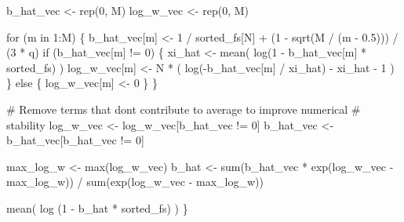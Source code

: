 \documentclass[
  letterpaper,
  DIV=11,
  numbers=noendperiod]{scrartcl}
\newenvironment{Shaded}{\begin{snugshade}}{\end{snugshade}}
\newcommand{\CommentTok}[1]{\textcolor[rgb]{0.37,0.37,0.37}{#1}}
\newcommand{\ControlFlowTok}[1]{\textcolor[rgb]{0.00,0.23,0.31}{#1}}
\newcommand{\DecValTok}[1]{\textcolor[rgb]{0.68,0.00,0.00}{#1}}
\newcommand{\FloatTok}[1]{\textcolor[rgb]{0.68,0.00,0.00}{#1}}
\newcommand{\FunctionTok}[1]{\textcolor[rgb]{0.28,0.35,0.67}{#1}}
\newcommand{\NormalTok}[1]{\textcolor[rgb]{0.00,0.23,0.31}{#1}}
\newcommand{\OtherTok}[1]{\textcolor[rgb]{0.00,0.23,0.31}{#1}}
\newcommand{\SpecialCharTok}[1]{\textcolor[rgb]{0.37,0.37,0.37}{#1}}
\begin{document}
\begin{Shaded}
\begin{Highlighting}[]
\NormalTok{  b\_hat\_vec }\OtherTok{\textless{}{-}} \FunctionTok{rep}\NormalTok{(}\DecValTok{0}\NormalTok{, M)}
\NormalTok{  log\_w\_vec }\OtherTok{\textless{}{-}} \FunctionTok{rep}\NormalTok{(}\DecValTok{0}\NormalTok{, M)}

  \ControlFlowTok{for}\NormalTok{ (m }\ControlFlowTok{in} \DecValTok{1}\SpecialCharTok{:}\NormalTok{M) \{}
\NormalTok{    b\_hat\_vec[m] }\OtherTok{\textless{}{-}} \DecValTok{1} \SpecialCharTok{/}\NormalTok{ sorted\_fs[N] }\SpecialCharTok{+} 
\NormalTok{                 (}\DecValTok{1} \SpecialCharTok{{-}} \FunctionTok{sqrt}\NormalTok{(M }\SpecialCharTok{/}\NormalTok{ (m }\SpecialCharTok{{-}} \FloatTok{0.5}\NormalTok{))) }\SpecialCharTok{/}\NormalTok{ (}\DecValTok{3} \SpecialCharTok{*}\NormalTok{ q)}
    \ControlFlowTok{if}\NormalTok{ (b\_hat\_vec[m] }\SpecialCharTok{!=} \DecValTok{0}\NormalTok{) \{}
\NormalTok{      xi\_hat }\OtherTok{\textless{}{-}} \FunctionTok{mean}\NormalTok{( }\FunctionTok{log}\NormalTok{(}\DecValTok{1} \SpecialCharTok{{-}}\NormalTok{ b\_hat\_vec[m] }\SpecialCharTok{*}\NormalTok{ sorted\_fs) )}
\NormalTok{      log\_w\_vec[m] }\OtherTok{\textless{}{-}}\NormalTok{ N }\SpecialCharTok{*}\NormalTok{ ( }\FunctionTok{log}\NormalTok{(}\SpecialCharTok{{-}}\NormalTok{b\_hat\_vec[m] }\SpecialCharTok{/}\NormalTok{ xi\_hat) }\SpecialCharTok{{-}}\NormalTok{ xi\_hat }\SpecialCharTok{{-}} \DecValTok{1}\NormalTok{ )}
\NormalTok{    \} }\ControlFlowTok{else}\NormalTok{ \{}
\NormalTok{      log\_w\_vec[m] }\OtherTok{\textless{}{-}} \DecValTok{0}
\NormalTok{    \}}
\NormalTok{  \}}
  
  \CommentTok{\# Remove terms that don\textquotesingle{}t contribute to average to improve numerical }
  \CommentTok{\# stability}
\NormalTok{  log\_w\_vec }\OtherTok{\textless{}{-}}\NormalTok{ log\_w\_vec[b\_hat\_vec }\SpecialCharTok{!=} \DecValTok{0}\NormalTok{]}
\NormalTok{  b\_hat\_vec }\OtherTok{\textless{}{-}}\NormalTok{ b\_hat\_vec[b\_hat\_vec }\SpecialCharTok{!=} \DecValTok{0}\NormalTok{]}

\NormalTok{  max\_log\_w }\OtherTok{\textless{}{-}} \FunctionTok{max}\NormalTok{(log\_w\_vec)}
\NormalTok{  b\_hat }\OtherTok{\textless{}{-}} \FunctionTok{sum}\NormalTok{(b\_hat\_vec }\SpecialCharTok{*} \FunctionTok{exp}\NormalTok{(log\_w\_vec }\SpecialCharTok{{-}}\NormalTok{ max\_log\_w)) }\SpecialCharTok{/}
           \FunctionTok{sum}\NormalTok{(}\FunctionTok{exp}\NormalTok{(log\_w\_vec }\SpecialCharTok{{-}}\NormalTok{ max\_log\_w))}

  \FunctionTok{mean}\NormalTok{( }\FunctionTok{log}\NormalTok{ (}\DecValTok{1} \SpecialCharTok{{-}}\NormalTok{ b\_hat }\SpecialCharTok{*}\NormalTok{ sorted\_fs) )}
\NormalTok{\}}


\end{Highlighting}
\end{Shaded}
\end{document}

